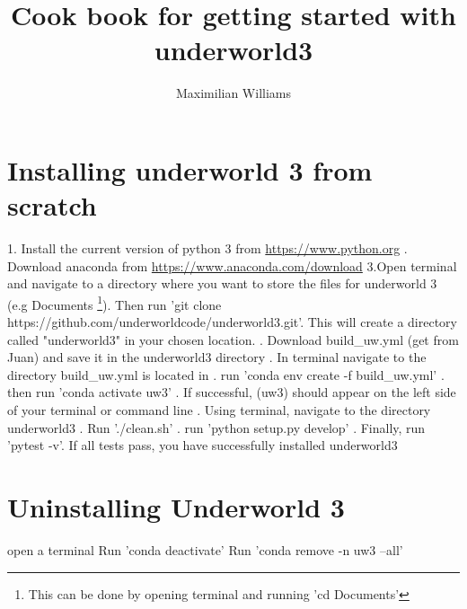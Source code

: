 \documentclass{article}
\title{Cook book for getting started with underworld3}
\author{Maximilian Williams }
\begin{document}
\maketitle

\section*{Installing underworld 3 from scratch}
1. Install the current version of python 3 from \url{https://www.python.org}
. Download anaconda from \url{https://www.anaconda.com/download}
\newline
3.Open terminal and navigate to a directory where you want to store the files for underworld 3 (e.g Documents \footnote{This can be done by opening terminal and running 'cd Documents'}). Then run 'git clone https://github.com/underworldcode/underworld3.git'. This will create a directory called "underworld3" in your chosen location.
. Download build\_uw.yml (get from Juan) and save it in the underworld3 directory
. In terminal navigate to the directory build\_uw.yml is located in
. run 'conda env create -f build\_uw.yml'
. then run 'conda activate uw3'
. If successful, (uw3) should appear on the left side of your terminal or command line
. Using terminal, navigate to the directory underworld3
. Run './clean.sh'
. run 'python setup.py develop'
. Finally, run 'pytest -v'.
\newline
If all tests pass, you have successfully installed underworld3

\section{Uninstalling Underworld 3}
open a terminal
\newline
Run 'conda deactivate'
\newline
Run 'conda remove -n uw3 --all'
\end{document}
